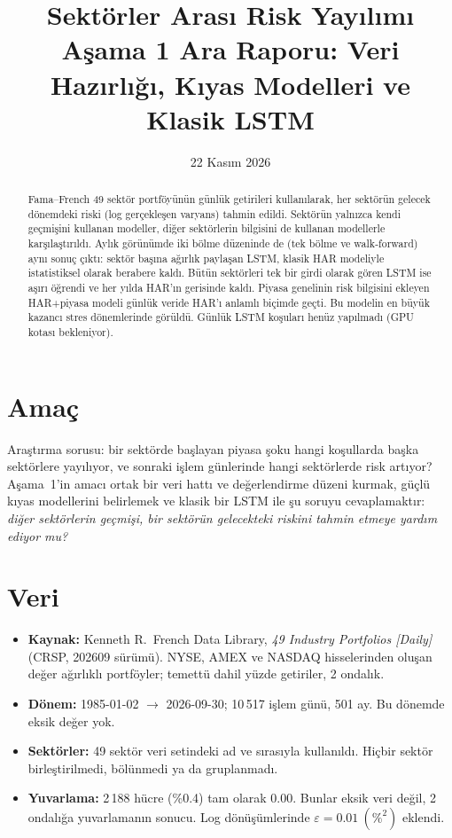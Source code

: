 \documentclass[11pt,a4paper]{article}
\title{Sektörler Arası Risk Yayılımı\\[2pt]\large Aşama 1 Ara Raporu: Veri Hazırlığı, Kıyas Modelleri ve Klasik LSTM}
\author{} %
\date{22 Kasım 2026}
\begin{document}
\maketitle

\begin{abstract}
\noindent
Fama--French 49 sektör portföyünün günlük getirileri kullanılarak, her sektörün gelecek dönemdeki riski
(log gerçekleşen varyans) tahmin edildi. Sektörün yalnızca kendi geçmişini kullanan modeller, diğer
sektörlerin bilgisini de kullanan modellerle karşılaştırıldı. Aylık görünümde iki bölme düzeninde de
(tek bölme ve walk-forward) aynı sonuç çıktı: sektör başına ağırlık paylaşan LSTM, klasik HAR modeliyle
istatistiksel olarak berabere kaldı. Bütün sektörleri tek bir girdi olarak gören LSTM ise aşırı öğrendi ve
her yılda HAR'ın gerisinde kaldı. Piyasa genelinin risk bilgisini ekleyen HAR+piyasa modeli günlük veride
HAR'ı anlamlı biçimde geçti. Bu modelin en büyük kazancı stres dönemlerinde görüldü. Günlük LSTM koşuları
henüz yapılmadı (GPU kotası bekleniyor).
\end{abstract}

\section{Amaç}
Araştırma sorusu: bir sektörde başlayan piyasa şoku hangi koşullarda başka sektörlere yayılıyor, ve
sonraki işlem günlerinde hangi sektörlerde risk artıyor? Aşama~1'in amacı ortak bir veri hattı ve
değerlendirme düzeni kurmak, güçlü kıyas modellerini belirlemek ve klasik bir LSTM ile şu soruyu
cevaplamaktır: \emph{diğer sektörlerin geçmişi, bir sektörün gelecekteki riskini tahmin etmeye yardım ediyor mu?}

\section{Veri}
\begin{itemize}
  \item \textbf{Kaynak:} Kenneth R.\ French Data Library, \emph{49 Industry Portfolios [Daily]} (CRSP, 202609 sürümü).
        NYSE, AMEX ve NASDAQ hisselerinden oluşan değer ağırlıklı portföyler; temettü dahil yüzde getiriler, 2 ondalık.
  \item \textbf{Dönem:} 1985-01-02 $\to$ 2026-09-30; 10\,517 işlem günü, 501 ay. Bu dönemde eksik değer yok.
  \item \textbf{Sektörler:} 49 sektör veri setindeki ad ve sırasıyla kullanıldı. Hiçbir sektör birleştirilmedi,
        bölünmedi ya da gruplanmadı.
  \item \textbf{Yuvarlama:} 2\,188 hücre (\%0.4) tam olarak 0.00. Bunlar eksik veri değil, 2 ondalığa yuvarlamanın
        sonucu. Log dönüşümlerinde $\varepsilon = 0.01\ (\%^2)$ eklendi.
\end{itemize}
\end{document}
